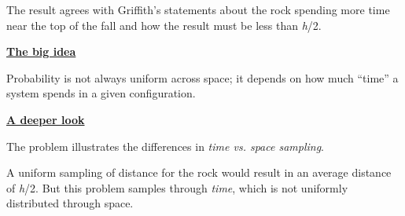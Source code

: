 \bigskip

The result agrees with Griffith's statements about the rock spending more time near the top of the fall and how the
result must be less than \textit{h}/2.

\textbf{\underline{The big idea}}

Probability is not always uniform across space; it depends on how much ``time'' a system spends in a given
configuration.

\smallskip

\textbf{\underline{A deeper look}}

The problem illustrates the differences in \textit{time vs. space sampling}.

A uniform sampling of distance for the rock would result in an average distance of \textit{h}/2. \newline But this
problem samples through \textit{time}, which is not uniformly distributed through space.

\newpage